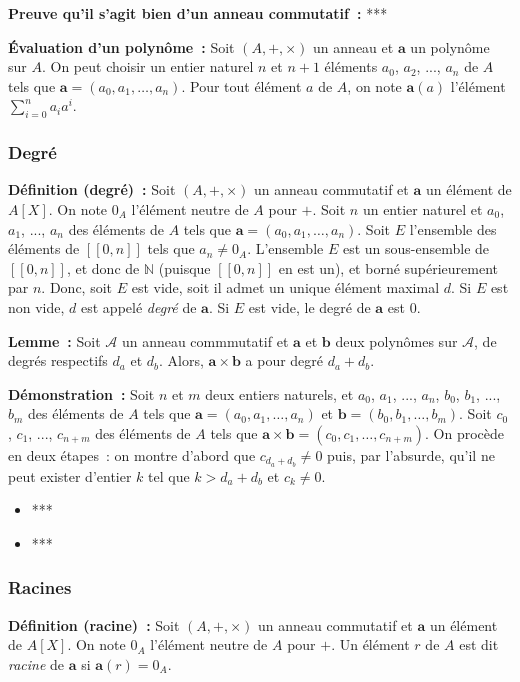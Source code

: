 \medskip

\noindent\textbf{Preuve qu'il s'agit bien d'un anneau commutatif :} ***

\medskip

\noindent\textbf{Évaluation d'un polynôme :} Soit $(A, +, \times)$ un anneau et $\mathbf{a}$ un polynôme sur $A$.
    On peut choisir un entier naturel $n$ et $n+1$ éléments $a_0$, $a_2$, ..., $a_n$ de $A$ tels que $\mathbf{a} = (a_0, a_1, \dots, a_n)$.
    Pour tout élément $a$ de $A$, on note $\mathbf{a}(a)$ l'élément $\sum_{i=0}^n a_i a^i$. 

\subsubsection{Degré}

\noindent\textbf{Définition (degré) :} Soit $(A, +, \times)$ un anneau commutatif et $\mathbf{a}$ un élément de $A[X]$.
    On note $0_A$ l'élément neutre de $A$ pour $+$.
    Soit $n$ un entier naturel et $a_0$, $a_1$, ..., $a_n$ des éléments de $A$ tels que $\mathbf{a} = (a_0, a_1, \dots, a_n)$.
    Soit $E$ l'ensemble des éléments de $[\![0, n]\!]$ tels que $a_n \neq 0_A$.
    L'ensemble $E$ est un sous-ensemble de $[\![0, n]\!]$, et donc de $\mathbb{N}$ (puisque $[\![0, n]\!]$ en est un), et borné supérieurement par $n$. 
    Donc, soit $E$ est vide, soit il admet un unique élément maximal $d$. 
    Si $E$ est non vide, $d$ est appelé \textit{degré} de $\mathbf{a}$. 
    Si $E$ est vide, le degré de $\mathbf{a}$ est $0$.

\medskip

\noindent\textbf{Lemme :} Soit $\mathcal{A}$ un anneau commmutatif et $\mathbf{a}$ et $\mathbf{b}$ deux polynômes sur $\mathcal{A}$, de degrés respectifs $d_a$ et $d_b$.
    Alors, $\mathbf{a} \times \mathbf{b}$ a pour degré $d_a + d_b$.

\medskip

\noindent\textbf{Démonstration :} 
    Soit $n$ et $m$ deux entiers naturels, et $a_0$, $a_1$, ..., $a_n$, $b_0$, $b_1$, ..., $b_m$ des éléments de $A$ tels que $\mathbf{a} = (a_0, a_1, \dots, a_n)$ et $\mathbf{b} = (b_0, b_1, \dots, b_m)$. 
    Soit $c_0$, $c_1$, ..., $c_{n+m}$ des éléments de $A$ tels que $\mathbf{a} \times \mathbf{b} = (c_0, c_1, \dots, c_{n+m})$.
    On procède en deux étapes : on montre d'abord que $c_{d_a + d_b} \neq 0$ puis, par l'absurde, qu'il ne peut exister d'entier $k$ tel que $k > d_a + d_b$ et $c_k \neq 0$.
    \begin{itemize}[nosep]
        \item ***
        \item ***
    \end{itemize}

\subsubsection{Racines}

\noindent\textbf{Définition (racine) :} Soit $(A, +, \times)$ un anneau commutatif et $\mathbf{a}$ un élément de $A[X]$.
    On note $0_A$ l'élément neutre de $A$ pour $+$.
    Un élément $r$ de $A$ est dit \textit{racine} de $\mathbf{a}$ si $\mathbf{a}(r) = 0_A$.
